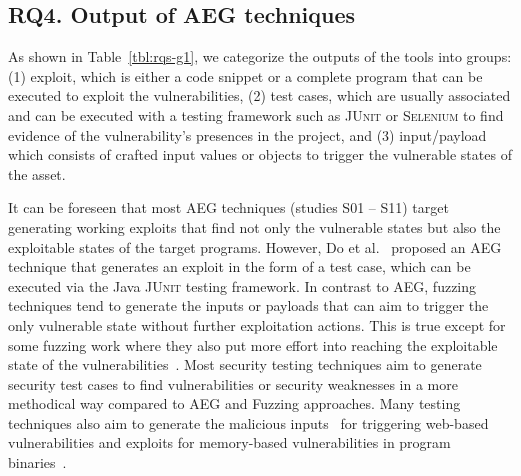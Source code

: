 \subsection{RQ4. Output of AEG techniques}

As shown in Table~\ref{tbl:rqs-g1}, we categorize the outputs of the tools into groups: (1) exploit, which is either a code snippet or a complete program that can be executed to exploit the vulnerabilities, (2) test cases, which are usually associated and can be executed with a testing framework such as \textsc{JUnit} or \textsc{Selenium} to find evidence of the vulnerability's presences in the project, and (3) input/payload which consists of crafted input values or objects to trigger the vulnerable states of the asset.

It can be foreseen that most AEG techniques (studies S01 -- S11) target generating working exploits that find not only the vulnerable states but also the exploitable states of the target programs.
{}
{}
However, Do et al.~\cite{Do2015401} proposed an AEG technique that generates an exploit in the form of a test case, which can be executed via the Java \textsc{JUnit} testing framework. In contrast to AEG, fuzzing techniques tend to generate the inputs or payloads that can aim to trigger the only vulnerable state without further exploitation actions.
This is true except for some fuzzing work where they also put more effort into reaching the exploitable state of the vulnerabilities~\cite{Bohme2019489}.
Most security testing techniques aim to generate security test cases to find vulnerabilities or security weaknesses in a more methodical way compared to AEG and Fuzzing approaches. Many testing techniques also aim to generate the malicious inputs~\cite{Bozic202020, Bozic2020115, Liu2020286, Appelt2014259} for triggering web-based vulnerabilities and exploits for memory-based vulnerabilities in program binaries~\cite{Nurmukhametov202137}.